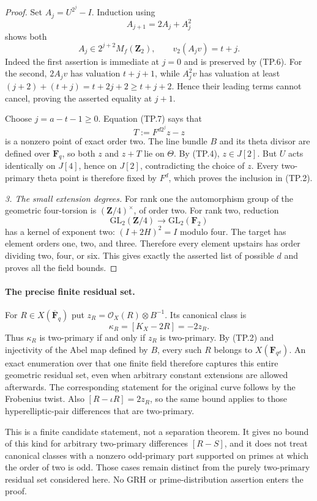 \begin{proof}
Set $A_j=U^{2^j}-I$. Induction using
\[
                         A_{j+1}=2A_j+A_j^2
 \tag{TP.6}
\]
shows both
\[
 A_j\in2^{j+2}M_f(\mathbf Z_2),\qquad
                         v_2(A_jv)=t+j.
 \tag{TP.7}
\]
Indeed the first assertion is immediate at $j=0$ and is preserved
by (TP.6). For the second, $2A_jv$ has valuation $t+j+1$, while
$A_j^2v$ has valuation at least
$(j+2)+(t+j)=t+2j+2\ge t+j+2$. Hence their leading terms
cannot cancel, proving the asserted equality at $j+1$.

Choose $j=a-t-1\ge0$. Equation (TP.7) says that
\[
                    T:=F^{d2^j}z-z
 \tag{TP.8}
\]
is a nonzero point of exact order two. The line bundle $B$ and
its theta divisor are defined over $\mathbf F_q$, so both $z$
and $z+T$ lie on $\Theta$. By (TP.4), $z\in J[2]$. But $U$
acts identically on $J[4]$, hence on $J[2]$, contradicting the
choice of $z$. Every two-primary theta point is therefore fixed
by $F^d$, which proves the inclusion in (TP.2).

\emph{3. The small extension degrees.}
For rank one the automorphism group of the geometric four-torsion
is $(\mathbf Z/4)^\times$, of order two. For rank two, reduction
\[
                  \mathrm{GL}_2(\mathbf Z/4)
                          \longrightarrow\mathrm{GL}_2(\mathbf F_2)
\]
has a kernel of exponent two: $(I+2H)^2=I$ modulo four.
The target has element orders one, two, and three. Therefore
every element upstairs has order dividing two, four, or six.
This gives exactly the asserted list of possible $d$ and proves
all the field bounds.
\end{proof}

\paragraph{The precise finite residual set.}
For $R\in X(\overline{\mathbf F}_q)$ put
$z_R=\mathcal O_X(R)\otimes B^{-1}$. Its canonical class is
\[
                    \kappa_R=[K_X-2R]=-2z_R.
 \tag{TP.9}
\]
Thus $\kappa_R$ is two-primary if and only if $z_R$ is
two-primary. By (TP.2) and injectivity of the Abel map defined
by $B$, every such $R$ belongs to $X(\mathbf F_{q^d})$.
An exact enumeration over that one finite field therefore
captures this entire geometric residual set, even when arbitrary
constant extensions are allowed afterwards. The corresponding
statement for the original curve follows by the Frobenius twist.
Also $[R-\iota R]=2z_R$, so the same bound applies to those
hyperelliptic-pair differences that are two-primary.

This is a finite candidate statement, not a separation theorem.
It gives no bound of this kind for arbitrary two-primary
differences $[R-S]$, and it does not treat canonical classes
with a nonzero odd-primary part supported on primes at which
the order of two is odd. Those cases remain distinct from the
purely two-primary residual set considered here. No GRH or
prime-distribution assertion enters the proof.
